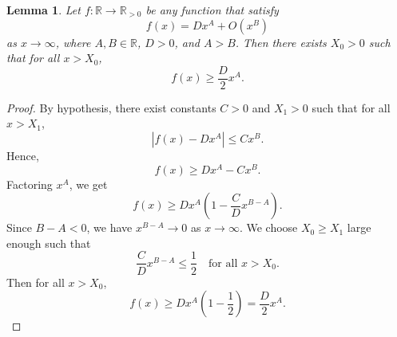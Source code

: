\documentclass[10pt]{amsart}
\newtheorem{lemma}[theorem]{Lemma}
\begin{document}
\begin{lemma}\label{dominating main term}
Let \(f: \mathbb{R} \to \mathbb{R}_{>0}\) be any function that satisfy
\[
f(x) = Dx^{A} + O(x^{B})
\]
as \(x \to \infty\), where \(A, B \in \mathbb{R}\), \( D>0\), and \(A > B\).  
Then there exists \(X_0 > 0\) such that for all \(x > X_0\),
\[
f(x) \ge \frac{D}{2} x^{A}.
\]
\end{lemma}
\begin{proof}
By hypothesis, there exist constants \(C > 0\) and \(X_1 > 0\) such that for all \(x > X_1\),
\[
|f(x) - Dx^{A}| \le C x^{B}.
\]
Hence,
\[
f(x) \ge Dx^{A} - C x^{B}.
\]
Factoring \(x^{A}\), we get
\[
f(x) \ge Dx^{A} \left( 1 - \frac{C}{D} x^{B-A} \right).
\]
Since \(B - A < 0\), we have \(x^{B-A} \to 0\) as \(x \to \infty\).  
We choose \(X_0 \ge X_1\) large enough such that
\[
\frac{C}{D} x^{B-A} \le \frac{1}{2} \quad \text{for all } x > X_0.
\]
Then for all \(x > X_0\),
\[
f(x) \ge Dx^{A} \left( 1 - \frac{1}{2} \right) = \frac{D}{2} x^{A}.
\]
\end{proof}
\end{document}
